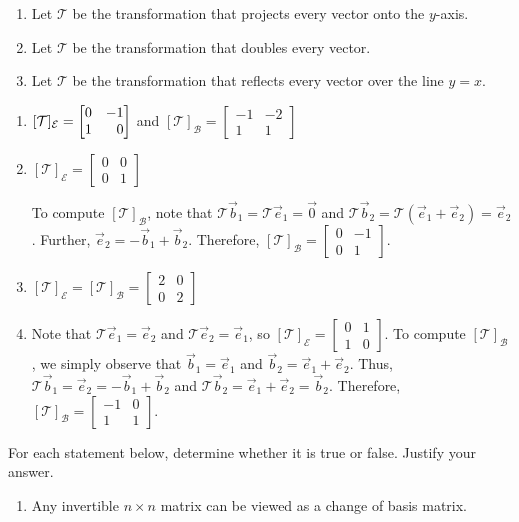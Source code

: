 \begin{exercises}
\begin{problist}
\begin{enumerate}
			\item Let $\mathcal T$ be the transformation that projects
				every vector onto the $y$-axis.
			
			\item Let $\mathcal T$ be the transformation that doubles
				every vector.

			\item Let $\mathcal T$ be the transformation that reflects
				every vector over the line $y=x$.
		\end{enumerate}
		\begin{solution}
			\begin{enumerate}
				\item 
					$[\mathcal T]_{\mathcal E}=\mat{0&-1\\1&0}$ and $[\mathcal T]_{\mathcal B}=
				\begin{bmatrix}
				-1 & -2 \\ 1 & 1
				\end{bmatrix}$
				\item 
				$[\mathcal T]_{\mathcal E}=
				\begin{bmatrix}
					0 & 0 \\ 0 & 1
				\end{bmatrix}$
				
				To compute $[\mathcal T]_{\mathcal B}$, note that $\mathcal T\vec b_1=\mathcal T\vec e_1=\vec 0$
				and $\mathcal T\vec b_2=\mathcal T(\vec e_1+\vec e_2)=\vec e_2$. Further,
				$\vec e_2=-\vec b_1+\vec b_2$. Therefore, 
				$[\mathcal T]_{\mathcal B}=
				\begin{bmatrix}
					0 & -1 \\ 0 & 1
				\end{bmatrix}$.
				\item 
				$[\mathcal T]_{\mathcal E}=[\mathcal T]_{\mathcal B}=
				\begin{bmatrix}
					2 & 0 \\ 0 & 2
				\end{bmatrix}$
				\item Note that $\mathcal T\vec e_1=\vec e_2$ and $\mathcal T\vec e_2=\vec e_1$, so
				$[\mathcal T]_{\mathcal E}=
				\begin{bmatrix}
					0 & 1 \\ 1 & 0
				\end{bmatrix}$.
				To compute $[\mathcal T]_{\mathcal B}$, we simply observe that $\vec b_1=\vec e_1$
				and $\vec b_2=\vec e_1+\vec e_2$. Thus, $\mathcal T\vec b_1=\vec e_2=-\vec b_1+\vec b_2$
				and $\mathcal T\vec b_2=\vec e_1+\vec e_2=\vec b_2$. Therefore, 
				$[\mathcal T]_{\mathcal B}=
				\begin{bmatrix}
					-1 & 0 \\ 1 & 1
				\end{bmatrix}$.
			\end{enumerate}
		\end{solution}
		\prob For each statement below, determine whether it is true or false. Justify your answer.
		\begin{enumerate}
			\item Any invertible $n \times n$ matrix can be viewed as
				a change of basis matrix.


\end{enumerate}
\end{problist}
\end{exercises}
